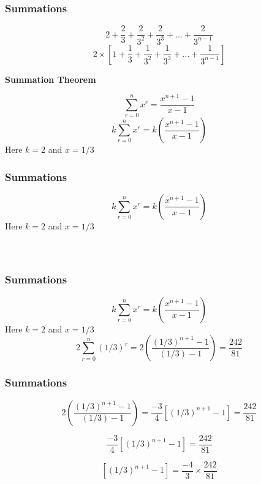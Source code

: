\documentclass{beamer}
\begin{document}
\begin{frame}
\frametitle{Summations}
\Large
\vspace{-0.5cm}
\[  2 + \frac{2}{3} + \frac{2}{3^2} + \frac{2}{3^3} +  \ldots + \frac{2}{3^{n-1}} \]
\[  2 \times \left[ 1 + \frac{1}{3} + \frac{1}{3^2} + \frac{1}{3^3} +  \ldots + \frac{1}{3^{n-1}}   \right] \]

\textbf{Summation Theorem}

\[ \sum^{n}_{r=0} x^r = \frac{x^{n+1}-1}{x-1} \]
\[ k  \sum^{n}_{r=0} x^r  =  k \left( \frac{x^{n+1}-1}{x-1} \right) \]
Here $k=2$ and $x = 1/3$ 


\end{frame}
\begin{frame}
\frametitle{Summations}
\Large
\vspace{-0.5cm}

\[ k  \sum^{n}_{r=0} x^r  =  k \left( \frac{x^{n+1}-1}{x-1} \right) \]
Here $k=2$ and $x = 1/3$ 
\[  \phantom{ 2  \sum^{n}_{r=0} (1/3)^r  =  2 \left( \frac{(1/3)^{n+1}-1}{(1/3)-1} \right) } \]


\end{frame}
\begin{frame}
\frametitle{Summations}
\Large
\vspace{-0.5cm}

\[ k  \sum^{n}_{r=0} x^r  =  k \left( \frac{x^{n+1}-1}{x-1} \right) \]
Here $k=2$ and $x = 1/3$ 
\[  2  \sum^{n}_{r=0} (1/3)^r  =  2 \left( \frac{(1/3)^{n+1}-1}{(1/3)-1} \right)  = \frac{242}{81} \]


\end{frame}
\begin{frame}
\frametitle{Summations}
\Large
\vspace{-0.5cm}
\[    2 \left( \frac{(1/3)^{n+1}-1}{(1/3)-1} \right)  = \frac{-3}{4} \left[ (1/3)^{n+1}-1 \right]  = \frac{242}{81} \]

\[     \frac{-3}{4} \left[ (1/3)^{n+1}-1 \right]  = \frac{242}{81} \]

\[      \left[ (1/3)^{n+1}-1 \right]  =  \frac{-4}{3} \times \frac{242}{81} \]

\end{frame}
\end{document}
